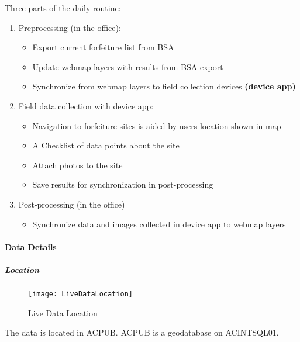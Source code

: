 \documentclass[class=article , crop=false, titlepage, twoside, multi={itemize, figure, verbatim}, float=false]{standalone}
\begin{document}
Three parts of the daily routine:
\begin{enumerate}
\item \Large Preprocessing \normalsize(in the office):

\begin{itemize}
\item Export current forfeiture list from BSA
\item Update webmap layers with results from BSA export
\item Synchronize from webmap layers to field collection devices \textbf{(device app)}
\end{itemize}

\item \Large Field data collection \normalsize with device app:

\begin{itemize}
\item Navigation to forfeiture sites is aided by users location shown in map
\item A Checklist of data points about the site
\item Attach photos to the site
\item Save results for synchronization in post-processing
\end{itemize}

\item \Large Post-processing \normalsize (in the office)

\begin{itemize}
\item Synchronize data and images collected in device app to webmap layers

\end{itemize}
\end{enumerate}

\clearpage
\paragraph{Data Details}
\subparagraph*{Location}

\begin{wrapfigure}{r}{0.5\textwidth}
\centering
\texttt{[image: LiveDataLocation]}
\caption{Live Data Location}
\end{wrapfigure}
The data is located in ACPUB.  ACPUB is a geodatabase on ACINTSQL01.
\end{document}
